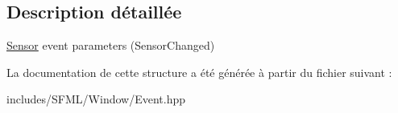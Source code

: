 \subsection{Description détaillée}
\hyperlink{classsf_1_1Sensor}{Sensor} event parameters (Sensor\+Changed) 

La documentation de cette structure a été générée à partir du fichier suivant \+:\begin{DoxyCompactItemize}
\item 
includes/\+S\+F\+M\+L/\+Window/Event.\+hpp\end{DoxyCompactItemize}
